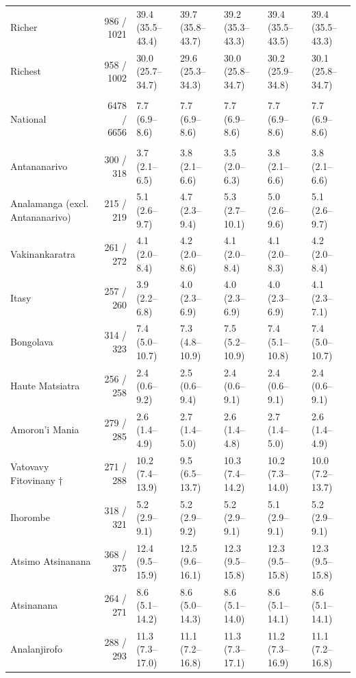 \begin{longtable}{l|rlllll}
Richer & 986 / 1021 & 39.4 (35.5–43.4) & 39.7 (35.8–43.7) & 39.2 (35.3–43.3) & 39.4 (35.5–43.5) & 39.4 (35.5–43.3) \\ 
Richest & 958 / 1002 & 30.0 (25.7–34.7) & 29.6 (25.3–34.3) & 30.0 (25.8–34.7) & 30.2 (25.9–34.8) & 30.1 (25.8–34.7) \\ 
\midrule\addlinespace[2.5pt]
\multicolumn{7}{l}{Wasting — National} \\[2.5pt] 
\midrule\addlinespace[2.5pt]
National & 6478 / 6656 & 7.7 (6.9–8.6) & 7.7 (6.9–8.6) & 7.7 (6.9–8.6) & 7.7 (6.9–8.6) & 7.7 (6.9–8.6) \\ 
\midrule\addlinespace[2.5pt]
\multicolumn{7}{l}{Wasting — Region} \\[2.5pt] 
\midrule\addlinespace[2.5pt]
Antananarivo & 300 / 318 & 3.7 (2.1–6.5) & 3.8 (2.1–6.6) & 3.5 (2.0–6.3) & 3.8 (2.1–6.6) & 3.8 (2.1–6.6) \\ 
Analamanga (excl. Antananarivo) & 215 / 219 & 5.1 (2.6–9.7) & 4.7 (2.3–9.4) & 5.3 (2.7–10.1) & 5.0 (2.6–9.6) & 5.1 (2.6–9.7) \\ 
Vakinankaratra & 261 / 272 & 4.1 (2.0–8.4) & 4.2 (2.0–8.6) & 4.1 (2.0–8.4) & 4.1 (2.0–8.3) & 4.2 (2.0–8.4) \\ 
Itasy & 257 / 260 & 3.9 (2.2–6.8) & 4.0 (2.3–6.9) & 4.0 (2.3–6.9) & 4.0 (2.3–6.9) & 4.1 (2.3–7.1) \\ 
Bongolava & 314 / 323 & 7.4 (5.0–10.7) & 7.3 (4.8–10.9) & 7.5 (5.2–10.9) & 7.4 (5.1–10.8) & 7.4 (5.0–10.7) \\ 
Haute Matsiatra & 256 / 258 & 2.4 (0.6–9.2) & 2.5 (0.6–9.4) & 2.4 (0.6–9.1) & 2.4 (0.6–9.1) & 2.4 (0.6–9.1) \\ 
Amoron'i Mania & 279 / 285 & 2.6 (1.4–4.9) & 2.7 (1.4–5.0) & 2.6 (1.4–4.8) & 2.7 (1.4–5.0) & 2.6 (1.4–4.9) \\ 
Vatovavy Fitovinany † & 271 / 288 & 10.2 (7.4–13.9) & 9.5 (6.5–13.7) & 10.3 (7.4–14.2) & 10.2 (7.3–14.0) & 10.0 (7.2–13.7) \\ 
Ihorombe & 318 / 321 & 5.2 (2.9–9.1) & 5.2 (2.9–9.2) & 5.2 (2.9–9.1) & 5.1 (2.9–9.1) & 5.2 (2.9–9.1) \\ 
Atsimo Atsinanana & 368 / 375 & 12.4 (9.5–15.9) & 12.5 (9.6–16.1) & 12.3 (9.5–15.8) & 12.3 (9.5–15.8) & 12.3 (9.5–15.8) \\ 
Atsinanana & 264 / 271 & 8.6 (5.1–14.2) & 8.6 (5.0–14.3) & 8.6 (5.1–14.0) & 8.6 (5.1–14.1) & 8.6 (5.1–14.1) \\ 
Analanjirofo & 288 / 293 & 11.3 (7.3–17.0) & 11.1 (7.2–16.8) & 11.3 (7.3–17.1) & 11.2 (7.3–16.9) & 11.1 (7.2–16.8) \\ 

\end{longtable}
